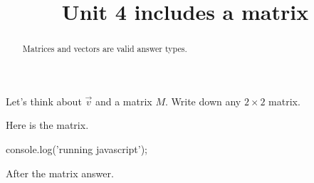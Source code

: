\documentclass{ximera}
\title{Unit 4 includes a matrix}
\begin{document}
\begin{abstract}
  Matrices and vectors are valid answer types.
\end{abstract}

\begin{exercise}
  Let's think about $\vec{v}$ and a matrix $M$.  Write down any $2
  \times 2$ matrix.

\begin{solution}
  Here is the matrix.

\begin{matrixanswer}[name=M]
  console.log('running javascript');    
\end{matrixanswer}

After the matrix answer.

\end{solution}

\end{exercise}
\end{document}
